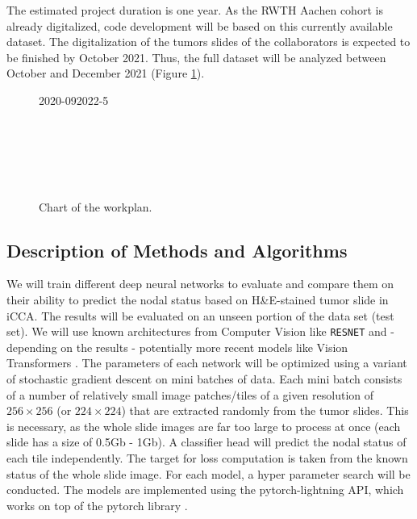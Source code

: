 \documentclass[12pt]{article}
\begin{document}
The estimated project duration is one year. As the RWTH Aachen cohort is already digitalized, code development will be based on this currently available dataset. The digitalization of the tumors slides of the collaborators is expected to be finished by October 2021. Thus, the full dataset will be analyzed between October and December 2021 (Figure \ref{fig:chart}).

\begin{figure}[htp]
\begin{ganttchart}[y unit title=0.6cm,
y unit chart=0.5cm,
hgrid,vgrid,
	time slot format=isodate-yearmonth,
	time slot unit=month,
	title height=.75, title top shift=0,
	bar height=0.6]{2020-09}{2022-5}
	 \\
	\\
	\\
	\\
	\\
	\\
\end{ganttchart}
\caption{Chart of the workplan.}
\label{fig:chart}
\end{figure}

\subsection{Description of Methods and Algorithms}
We will train different deep neural networks to evaluate and compare them on their ability to predict the nodal status based on H\&E-stained tumor slide in iCCA. The results will be evaluated on an unseen portion of the data set (test set). We will use known architectures from Computer Vision like  \texttt{RESNET} and - depending on the results - potentially more recent models like Vision Transformers \cite{b23, b24}. The parameters of each network will be optimized using a variant of stochastic gradient descent on mini batches of data. Each mini batch consists of a number of relatively small image patches/tiles of a given resolution of $256\times 256$ (or $224 \times 224$) that are extracted randomly from the tumor slides. This is necessary, as the whole slide images are far too large to process at once (each slide has a size of 0.5Gb - 1Gb). A classifier head will predict the nodal status of each tile independently. The target for loss computation is taken from the known status of the whole slide image. For each model, a hyper parameter search will be conducted. The models are implemented using the pytorch-lightning API, which works on top of the pytorch library \cite{b25, b26}.
\end{document}
